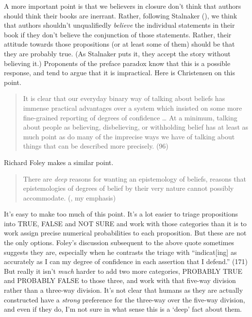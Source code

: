 \documentclass[
  11pt,
  letterpaper,
  DIV=11,
  numbers=noendperiod,
  oneside]{scrartcl}
\begin{document}
A more important point is that we believers in closure don't think that
authors should think their books are inerrant. Rather, following
Stalnaker (), we think that authors
shouldn't unqualifiedly \emph{believe} the individual statements in
their book if they don't believe the conjunction of those statements.
Rather, their attitude towards those propositions (or at least some of
them) should be that they are probably true. (As Stalnaker puts it, they
accept the story without believing it.) Proponents of the preface
paradox know that this is a possible response, and tend to argue that it
is impractical. Here is Christensen on this point.

\begin{quote}
It is clear that our everyday binary way of talking about beliefs has
immense practical advantages over a system which insisted on some more
fine-grained reporting of degrees of confidence \ldots{} At a minimum,
talking about people as believing, disbelieving, or withholding belief
has at least as much point as do many of the imprecise ways we have of
talking about things that can be described more precisely. (96)
\end{quote}

Richard Foley makes a similar point.

\begin{quote}
There are \emph{deep} reasons for wanting an epistemology of beliefs,
reasons that epistemologies of degrees of belief by their very nature
cannot possibly accommodate. (,
my emphasis)
\end{quote}

It's easy to make too much of this point. It's a lot easier to triage
propositions into TRUE, FALSE and NOT SURE and work with those
categories than it is to work assign precise numerical probabilities to
each proposition. But these are not the only options. Foley's discussion
subsequent to the above quote sometimes suggests they are, especially
when he contrasts the triage with ``indicat{[}ing{]} as accurately as I
can my degree of confidence in each assertion that I defend.'' (171) But
really it isn't \emph{much} harder to add two more categories, PROBABLY
TRUE and PROBABLY FALSE to those three, and work with that five-way
division rather than a three-way division. It's not clear that humans as
they are actually constructed have a \emph{strong} preference for the
three-way over the five-way division, and even if they do, I'm not sure
in what sense this is a `deep' fact about them.
\end{document}
